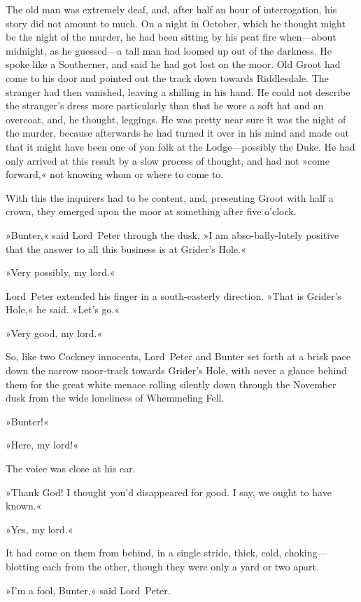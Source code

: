 The old man was extremely deaf, and, after half an hour of interrogation, his story did not amount to much. On a night in October, which he thought might be the night of the murder, he had been sitting by his peat fire when—about midnight, as he guessed—a tall man had loomed up out of the darkness. He spoke like a Southerner, and said he had got lost on the moor. Old Groot had come to his door and pointed out the track down towards Riddlesdale. The stranger had then vanished, leaving a shilling in his hand. He could not describe the stranger's dress more particularly than that he wore a soft hat and an overcoat, and, he thought, leggings. He was pretty near sure it was the night of the murder, because afterwards he had turned it over in his mind and made out that it might have been one of yon folk at the Lodge—possibly the Duke. He had only arrived at this result by a slow process of thought, and had not »come forward,« not knowing whom or where to come to.

With this the inquirers had to be content, and, presenting Groot with half a crown, they emerged upon the moor at something after five o'clock.

»Bunter,« said Lord~Peter through the dusk, »I am abso-bally-lutely positive that the answer to all this business is at Grider's Hole.«

»Very possibly, my lord.«

Lord~Peter extended his finger in a south-easterly direction. »That is Grider's Hole,« he said. »Let's go.«

»Very good, my lord.«

So, like two Cockney innocents, Lord~Peter and Bunter set forth at a brisk pace down the narrow moor-track towards Grider's Hole, with never a glance behind them for the great white menace rolling silently down through the November dusk from the wide loneliness of Whemmeling Fell.

»Bunter!«

»Here, my lord!«

The voice was close at his ear.

»Thank God! I thought you'd disappeared for good. I say, we ought to have known.«

»Yes, my lord.«

It had come on them from behind, in a single stride, thick, cold, choking—blotting each from the other, though they were only a yard or two apart.

»I'm a fool, Bunter,« said Lord~Peter.


